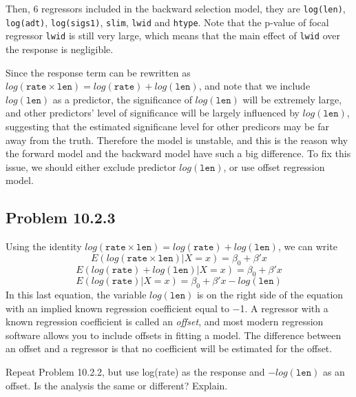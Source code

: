 \documentclass[12pt,oneside,a4paper]{article}\usepackage[]{graphicx}\usepackage[]{xcolor}
\newcommand{\subproblem}[1]
{
    \subsection*{Problem {#1}}
}
\newcommand{\m}[1]{\texttt{{#1}}}
\begin{document}
Then, 6 regressors included in the backward selection model, they are \m{log(len)}, \m{log(adt)}, \m{log(sigs1)}, \m{slim}, \m{lwid} and \m{htype}. Note that the p-value of focal regressor \m{lwid} is still very large, which means that the main effect of \m{lwid} over the response is negligible.

Since the response term can be rewritten as $log(\m{rate} \times \m{len}) = log(\m{rate}) + log(\m{len})$, and note that we include $log(\m{len})$ as a predictor, the significance of $log(\m{len})$ will be extremely large, and other predictors' level of significance will be largely influenced by $log(\m{len})$, suggesting that the estimated significane level for other predicors may be far away from the truth. Therefore the model is unstable, and this is the reason why the forward model and the backward model have such a big difference. To fix this issue, we should either exclude predictor $log(\m{len})$, or use offset regression model.


\subproblem{10.2.3}
Using the identity $log(\m{rate}\times\m{len}) = log(\m{rate}) + log(\m{len})$, we can write
$$E(log(\m{rate}\times\m{len})|X = x) = \beta_{0} + \beta'x$$
$$E(log(\m{rate}) + log(\m{len})|X = x) = \beta_{0} + \beta'x$$
$$E(log(\m{rate})|X=x) = \beta_{0} + \beta'x - log(\m{len})$$
In this last equation, the variable $log(\m{len})$ is on the right side of the equation with an implied known regression coefficient equal to −1. A regressor with a known regression coefficient is called an \emph{offset}, and most modern regression software allows you to include offsets in fitting a model. The difference between an offset and a regressor is that no coefficient will be estimated for the offset.\par
Repeat Problem 10.2.2, but use log(rate) as the response and $−log(\m{len})$ as an offset. Is the analysis the same or different? Explain.
\end{document}
